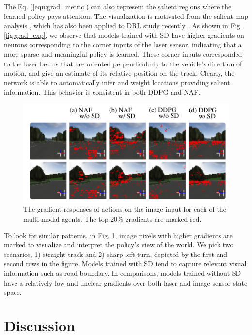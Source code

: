 \documentclass[../thesis.tex]{subfiles}
\begin{document}
The Eq. (\ref{equ:grad_metric}) can also represent the salient regions where the learned policy pays attention. The visualization is motivated from the salient map analysis \cite{simonyan2015deep}, which has also been applied to DRL study recently \cite{wang2015dueling}. As shown in Fig. \ref{fig:grad_exp}, we observe that models trained with SD have higher gradients on neurons corresponding to the corner inputs of the laser sensor, indicating that a more sparse and meaningful policy is learned. These corner inputs corresponded to the laser beams that are oriented perpendicularly to the vehicle's direction of motion, and give an estimate of its relative position on the track. Clearly, the network is able to automatically infer and weight locations providing salient information. This behavior is consistent in both DDPG and NAF.

\begin{figure}[t]
	\begin{center}
		\centerline{\includegraphics[width=0.8\columnwidth]{./MultimodalDRL/fig/grad_image.png}}
		\caption{The gradient responses of actions on the image input for each of the multi-modal agents. The top $20\%$ gradients are marked red.}
		\label{fig:grad_exp_img}
	\end{center}
\end{figure} 

To look for similar patterns, in Fig. \ref{fig:grad_exp_img}, image pixels with higher gradients are marked to visualize and interpret the policy's view of the world. We pick two scenarios, 1) straight track and 2) sharp left turn, depicted by the first and second rows in the figure. Models trained with SD tend to capture relevant visual information such as road boundary. In comparisons, models trained without SD have a relatively low and unclear gradients over both laser and image sensor state space.


\section{Discussion} \label{sec:mdrl-discussion}
\end{document}
